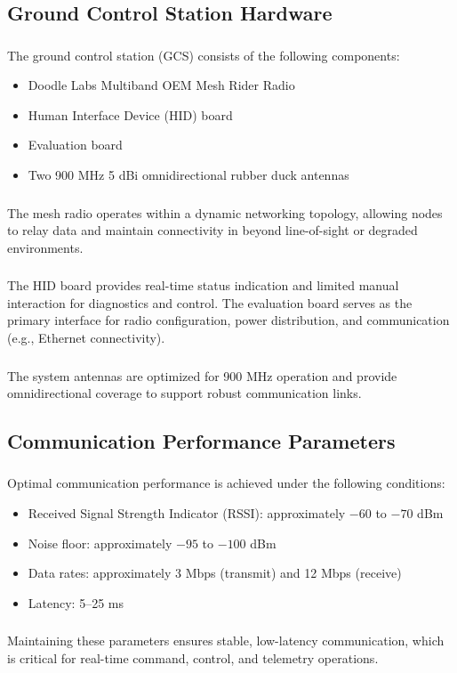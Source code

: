 \subsection{Ground Control Station Hardware}
    \subsubsection{} The ground control station (GCS) consists of the following components:
    \begin{itemize}
        \item Doodle Labs Multiband OEM Mesh Rider Radio
        \item Human Interface Device (HID) board
        \item Evaluation board
        \item Two 900 MHz 5 dBi omnidirectional rubber duck antennas
    \end{itemize}

    \subsubsection{} The mesh radio operates within a dynamic networking topology, allowing nodes to relay data and maintain connectivity in beyond line-of-sight or degraded environments.

    \subsubsection{} The HID board provides real-time status indication and limited manual interaction for diagnostics and control. The evaluation board serves as the primary interface for radio configuration, power distribution, and communication (e.g., Ethernet connectivity).

\subsubsection{} The system antennas are optimized for 900 MHz operation and provide omnidirectional coverage to support robust communication links.

\subsection{Communication Performance Parameters}
\subsubsection{} Optimal communication performance is achieved under the following conditions:
\begin{itemize}
    \item Received Signal Strength Indicator (RSSI): approximately $-60$ to $-70$ dBm
    \item Noise floor: approximately $-95$ to $-100$ dBm
    \item Data rates: approximately 3 Mbps (transmit) and 12 Mbps (receive)
    \item Latency: 5--25 ms
\end{itemize}

\subsubsection{} Maintaining these parameters ensures stable, low-latency communication, which is critical for real-time command, control, and telemetry operations.


